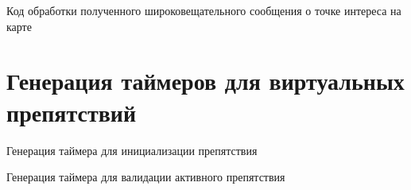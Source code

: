 \begin{ListingEnv}
	\caption{Код обработки полученного широковещательного сообщения о точке интереса на карте}
	\UseRawInputEncoding
	\footnotesize
	
	\label{list:geofence_brr_on_receive}
\end{ListingEnv}

\section{Генерация таймеров для виртуальных препятствий}
\begin{ListingEnv}
	\caption{Генерация таймера для инициализации препятствия}
	\UseRawInputEncoding
	\footnotesize
	
	\label{list:generate_obstacle_start_timer}
\end{ListingEnv}

\begin{ListingEnv}
	\caption{Генерация таймера для валидации активного препятствия}
	\UseRawInputEncoding
	\footnotesize
	
	\label{list:generate_obstacle_finish_timer}
\end{ListingEnv}